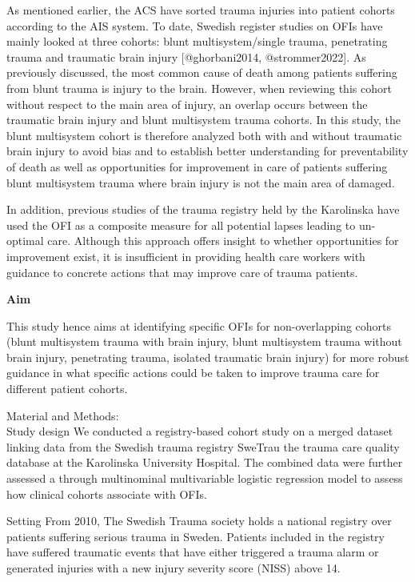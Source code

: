 \documentclass[
]{article}
\begin{document}
As mentioned earlier, the ACS have sorted trauma injuries into patient
cohorts according to the AIS system. To date, Swedish register studies
on OFIs have mainly looked at three cohorts: blunt multisystem/single
trauma, penetrating trauma and traumatic brain injury {[}@ghorbani2014,
@strommer2022{]}. As previously discussed, the most common cause of
death among patients suffering from blunt trauma is injury to the brain.
However, when reviewing this cohort without respect to the main area of
injury, an overlap occurs between the traumatic brain injury and blunt
multisystem trauma cohorts. In this study, the blunt multisystem cohort
is therefore analyzed both with and without traumatic brain injury to
avoid bias and to establish better understanding for preventability of
death as well as opportunities for improvement in care of patients
suffering blunt multisystem trauma where brain injury is not the main
area of damaged.

In addition, previous studies of the trauma registry held by the
Karolinska have used the OFI as a composite measure for all potential
lapses leading to un-optimal care. Although this approach offers insight
to whether opportunities for improvement exist, it is insufficient in
providing health care workers with guidance to concrete actions that may
improve care of trauma patients.

\textbf{Aim}

This study hence aims at identifying specific OFIs for non-overlapping
cohorts (blunt multisystem trauma with brain injury, blunt multisystem
trauma without brain injury, penetrating trauma, isolated traumatic
brain injury) for more robust guidance in what specific actions could be
taken to improve trauma care for different patient cohorts.

Material and Methods:\\
Study design We conducted a registry-based cohort study on a merged
dataset linking data from the Swedish trauma registry SweTrau the trauma
care quality database at the Karolinska University Hospital. The
combined data were further assessed a through multinominal multivariable
logistic regression model to assess how clinical cohorts associate with
OFIs.

Setting From 2010, The Swedish Trauma society holds a national registry
over patients suffering serious trauma in Sweden. Patients included in
the registry have suffered traumatic events that have either triggered a
trauma alarm or generated injuries with a new injury severity score
(NISS) above 14.
\end{document}
